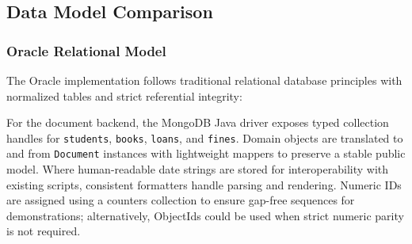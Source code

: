 \documentclass[12pt,a4paper]{article}
\begin{document}
\subsection{Data Model Comparison}

\subsubsection{Oracle Relational Model}
The Oracle implementation follows traditional relational database principles with normalized tables and strict referential integrity:
\begin{comment}
\begin{lstlisting}[language=SQL, caption=Oracle Database Schema]
-- Students table with constraints
CREATE TABLE Students (
    student_id NUMBER PRIMARY KEY,
    name VARCHAR2(100) NOT NULL,
    email VARCHAR2(100) UNIQUE NOT NULL,
    phone VARCHAR2(20),
    address VARCHAR2(200),
    registration_date DATE DEFAULT SYSDATE
);

-- Books table with data validation
CREATE TABLE Books (
    book_id NUMBER PRIMARY KEY,
    title VARCHAR2(200) NOT NULL,
    author VARCHAR2(100) NOT NULL,
    isbn VARCHAR2(20) UNIQUE,
    category VARCHAR2(50),
    publication_year NUMBER(4),
    available_copies NUMBER DEFAULT 0,
    total_copies NUMBER DEFAULT 0
);

-- Loans table with foreign key constraints ensuring referential integrity
CREATE TABLE Loans (
    loan_id NUMBER PRIMARY KEY,
    student_id NUMBER NOT NULL,
    book_id NUMBER NOT NULL,
    loan_date DATE DEFAULT SYSDATE,
    due_date DATE NOT NULL,
    return_date DATE,
    status VARCHAR2(20) DEFAULT 'ACTIVE',
    renewal_count NUMBER DEFAULT 0,
    CONSTRAINT fk_loan_student FOREIGN KEY (student_id) REFERENCES Students(student_id),
    CONSTRAINT fk_loan_book FOREIGN KEY (book_id) REFERENCES Books(book_id)
);
\end{lstlisting}
\end{comment}

For the document backend, the MongoDB Java driver exposes typed collection handles for \texttt{students}, \texttt{books}, \texttt{loans}, and \texttt{fines}. Domain objects are translated to and from \texttt{Document} instances with lightweight mappers to preserve a stable public model. Where human-readable date strings are stored for interoperability with existing scripts, consistent formatters handle parsing and rendering. Numeric IDs are assigned using a counters collection to ensure gap-free sequences for demonstrations; alternatively, ObjectIds could be used when strict numeric parity is not required.
\end{document}
